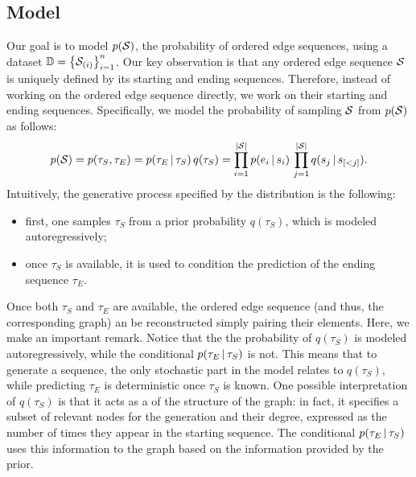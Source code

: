 \subsection{Model}
Our goal is to model $p(\OES{S})$, the probability of ordered edge sequences, using a dataset $\Data = \Set{\OES{S}_{(i)}}_{i=1}^n$. Our key observation is that any ordered edge sequence $\OES{S}$ is uniquely defined by its starting and ending sequences. Therefore, instead of working on the ordered edge sequence directly, we work on their starting and ending sequences. Specifically, we model the probability of sampling $\OES{S}$ from $p(\OES{S})$ as follows:
$$p(\OES{S}) = p(\tau_S, \tau_E) = p(\tau_E \given \tau_S)\, q(\tau_S) = \prod_{i=1}^{|\OES{S}|} p(e_i \given s_i)\, \prod_{j=1}^{|\OES{S}|} q(s_j \given s_{[<j]}).$$
Intuitively, the generative process specified by the distribution is the following:
\begin{itemize}
    \item first, one samples $\tau_S$ from a prior probability $q(\tau_S)$, which is modeled autoregressively;
    \item once $\tau_S$ is available, it is used to condition the prediction of the ending sequence $\tau_E$.
\end{itemize}
Once both $\tau_S$ and $\tau_E$ are available, the ordered edge sequence (and thus, the corresponding graph) an be reconstructed simply pairing their elements. Here, we make an important remark. Notice that the the probability of $q(\tau_S)$ is modeled autoregressively, while the conditional $p(\tau_E \,|\, \tau_S)$ is not. This means that to generate a sequence, the only stochastic part in the model relates to $q(\tau_S)$, while predicting $\tau_E$ is deterministic once $\tau_S$ is known. One possible interpretation of $q(\tau_S)$ is that it acts as a  of the structure of the graph: in fact, it specifies a subset of relevant nodes for the generation and their degree, expressed as the number of times they appear in the starting sequence. The conditional $p(\tau_E \,|\, \tau_S)$ uses this information to  the graph based on the information provided by the prior.

